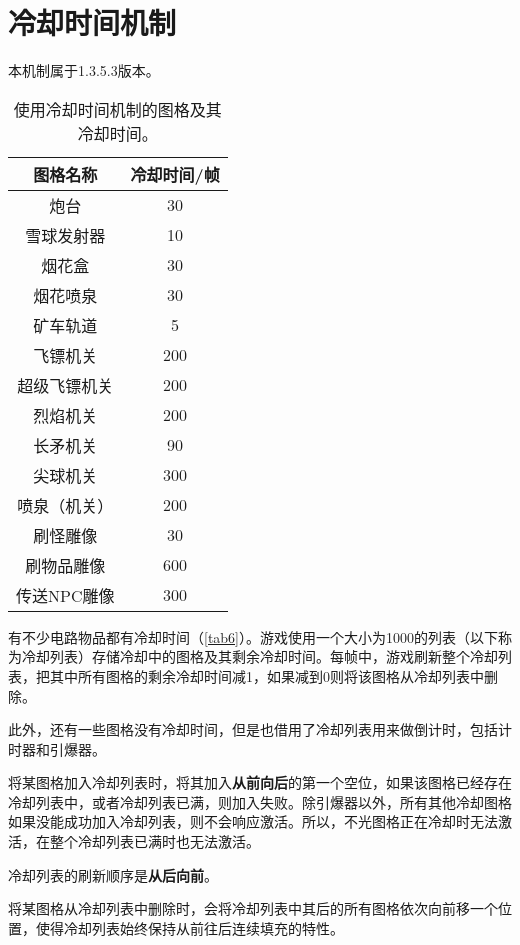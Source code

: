 \chapter{冷却时间机制}\label{app35}
\begin{note}
本机制属于1.3.5.3版本。
\end{note}
\begin{table}[!ht]
\centering
\begin{tabular}{|c|c|}
\hline
图格名称&冷却时间/帧\\\hline\hline
炮台&30\\\hline
雪球发射器&10\\\hline
烟花盒&30\\\hline
烟花喷泉&30\\\hline
矿车轨道&5\\\hline
飞镖机关&200\\\hline
超级飞镖机关&200\\\hline
烈焰机关&200\\\hline
长矛机关&90\\\hline
尖球机关&300\\\hline
喷泉（机关）&200\\\hline
刷怪雕像&30\\\hline
刷物品雕像&600\\\hline
传送NPC雕像&300\\\hline
\end{tabular}
\caption{使用冷却时间机制的图格及其冷却时间。}\label{tab6}
\end{table}

有不少电路物品都有冷却时间（\autoref{tab6}）。游戏使用一个大小为1000的列表（以下称为冷却列表）存储冷却中的图格及其剩余冷却时间。每帧中，游戏刷新整个冷却列表，把其中所有图格的剩余冷却时间减1，如果减到0则将该图格从冷却列表中删除。

此外，还有一些图格没有冷却时间，但是也借用了冷却列表用来做倒计时，包括计时器和引爆器。

将某图格加入冷却列表时，将其加入\textbf{从前向后}的第一个空位，如果该图格已经存在冷却列表中，或者冷却列表已满，则加入失败。除引爆器以外，所有其他冷却图格如果没能成功加入冷却列表，则不会响应激活。所以，不光图格正在冷却时无法激活，在整个冷却列表已满时也无法激活。

冷却列表的刷新顺序是\textbf{从后向前}。

将某图格从冷却列表中删除时，会将冷却列表中其后的所有图格依次向前移一个位置，使得冷却列表始终保持从前往后连续填充的特性。